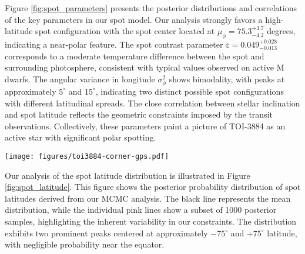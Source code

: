 \documentclass[twocolumn]{aastex631}
\begin{document}
Figure \ref{fig:spot_parameters} presents the posterior distributions and correlations of the key parameters in our spot model. 
Our analysis strongly favors a high-latitude spot configuration with the spot center located at $\mu_{\phi} = {75.3}^{+3.7}_{-4.2}$ 
degrees, indicating a near-polar feature. The spot contrast parameter $\mathbb{c} = 0.049^{+0.028}_{-0.013}$ corresponds to a 
moderate temperature difference between the spot and surrounding photosphere, consistent with typical values observed on active M 
dwarfs. The angular variance in longitude $\sigma^2_{\phi}$ shows bimodality, with peaks at approximately $5^{\circ}$ 
and $15^{\circ}$, indicating two distinct possible spot configurations with different latitudinal spreads. 
The close correlation between stellar inclination and spot latitude reflects the geometric constraints imposed by the transit 
observations. Collectively, these parameters paint a picture of TOI-3884 as an active star with significant polar spotting.

\begin{figure*}[hbt!]
    \centering
    \texttt{[image: figures/toi3884-corner-gps.pdf]}
    \caption{Corner plot showing the posterior distributions and correlations for the spot model parameters. 
    The diagonal panels display the marginalized posterior distributions for each parameter: the spot size 
    $\mathcal{r}$ ($^{\circ}$), spot contrast $\mathcal{c}$, number of spots $\mathcal{n}$, spot latitude $\mu_{\phi}$ ($^{\circ}$), 
    and the angular variance in latitude $\sigma^2_{\phi}$ ($^{\circ}$). The spot latitude is concentrated at high values around 
    $75^{\circ}$--$80^{\circ}$, 
    confirming the presence of a near-polar spot. The spot contrast is relatively modest with most of the probability mass below
     0.1. The number of spots tends toward values between 7.5 and 10, suggesting a relatively small number of spots.}
    \label{fig:spot_parameters}
\end{figure*}

Our analysis of the spot latitude distribution is illustrated in Figure \ref{fig:spot_latitude}. This figure shows the posterior 
probability distribution of spot latitudes derived from our MCMC analysis. The black line represents the mean distribution, 
while the individual pink lines show a subset of 1000 posterior samples, highlighting the inherent variability in our constraints. 
The distribution exhibits two prominent peaks centered at approximately $-75^{\circ}$ and $+75^{\circ}$ latitude, 
with negligible probability near the equator.
\end{document}
